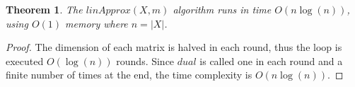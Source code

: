 \documentclass[letterpaper]{article} %
\newtheorem{theorem}[thm]{Theorem}
\newtheorem{example}[thm]{Example}
\begin{document}
\begin{theorem}\label{the:complexityLinear}
	The $linApprox(X,m)$ algorithm runs in time $O(n \log(n))$, using $O(1)$ memory where $n=|X|$.
\end{theorem}
\begin{proof}
The dimension of each matrix is halved in each round, thus the loop is executed $O(\log(n))$ rounds. Since $dual$ is called one in each round and a finite number of times at the end, the time complexity is $O(n \log(n))$.
\end{proof}



\end{document}
